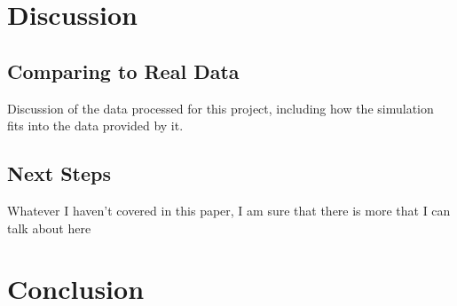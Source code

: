 \documentclass{article}
\begin{document}
\section{Discussion}
\subsection{Comparing to Real Data}
Discussion of the data processed for this project, including how the simulation fits into the data provided by it.
\subsection{Next Steps}
Whatever I haven't covered in this paper, I am sure that there is more that I can talk about here
\section{Conclusion}
\end{document}

